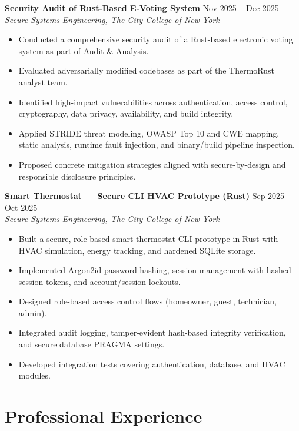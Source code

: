 \documentclass[10pt]{article}
\begin{document}
\textbf{Security Audit of Rust-Based E-Voting System} \hfill Nov 2025 -- Dec 2025\\
\textit{Secure Systems Engineering, The City College of New York}
\vspace{2pt}
\begin{itemize}
  \item Conducted a comprehensive security audit of a Rust-based electronic voting system as part of Audit \& Analysis.
  \item Evaluated adversarially modified codebases as part of the ThermoRust analyst team.
  \item Identified high-impact vulnerabilities across authentication, access control, cryptography, data privacy, availability, and build integrity.
  \item Applied STRIDE threat modeling, OWASP Top 10 and CWE mapping, static analysis, runtime fault injection, and binary/build pipeline inspection.
  \item Proposed concrete mitigation strategies aligned with secure-by-design and responsible disclosure principles.
\end{itemize}
\vspace{2pt}
\textbf{Smart Thermostat — Secure CLI HVAC Prototype (Rust)} \hfill Sep 2025 -- Oct 2025\\
\textit{Secure Systems Engineering, The City College of New York}
\vspace{2pt}
\begin{itemize}
  \item Built a secure, role-based smart thermostat CLI prototype in Rust with HVAC simulation, energy tracking, and hardened SQLite storage.
  \item Implemented Argon2id password hashing, session management with hashed session tokens, and account/session lockouts.
  \item Designed role-based access control flows (homeowner, guest, technician, admin).
  \item Integrated audit logging, tamper-evident hash-based integrity verification, and secure database PRAGMA settings.
  \item Developed integration tests covering authentication, database, and HVAC modules.
\end{itemize}

\section*{Professional Experience}
\end{document}
